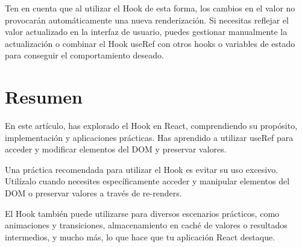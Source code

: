 Ten en cuenta que al utilizar el Hook  de esta forma, los cambios en el valor  no provocarán automáticamente una nueva renderización. Si necesitas reflejar el valor actualizado en la interfaz de usuario, puedes gestionar manualmente la actualización o combinar el Hook useRef con otros hooks o variables de estado para conseguir el comportamiento deseado.

\section*{Resumen}

En este artículo, has explorado el Hook  en React, comprendiendo su propósito, implementación y aplicaciones prácticas. Has aprendido a utilizar useRef para acceder y modificar elementos del DOM y preservar valores.

Una práctica recomendada para utilizar el Hook  es evitar su uso excesivo. Utilízalo cuando necesites específicamente acceder y manipular elementos del DOM o preservar valores a través de re-renders.

El Hook  también puede utilizarse para diversos escenarios prácticos, como animaciones y transiciones, almacenamiento en caché de valores o resultados intermedios, y mucho más, lo que hace que tu aplicación React destaque.


